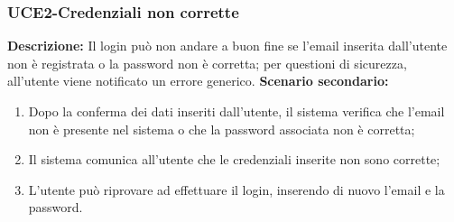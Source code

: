 \subsubsection{UCE2-Credenziali non corrette}
\textbf{Descrizione:} Il login può non andare a buon fine se l'email inserita dall'utente non è registrata
o la password non è corretta; per questioni di sicurezza, all'utente viene notificato un errore generico.
\textbf{Scenario secondario:}
\begin{enumerate}
    \item Dopo la conferma dei dati inseriti dall'utente, il sistema verifica che l'email non è presente nel sistema o che la password associata non è corretta;
    \item Il sistema comunica all'utente che le credenziali inserite non sono corrette;
    \item L'utente può riprovare ad effettuare il login, inserendo di nuovo l'email e la password.
\end{enumerate}
